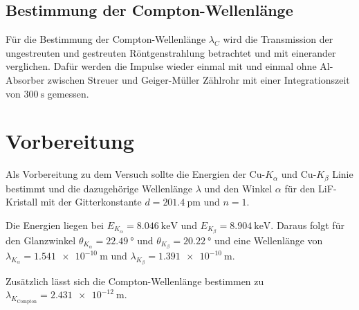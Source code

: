 \subsection{Bestimmung der Compton-Wellenlänge }
Für die Bestimmung der Compton-Wellenlänge $\lambda_C$ wird die Transmission der ungestreuten und gestreuten Röntgenstrahlung betrachtet und mit einerander verglichen. Dafür werden die Impulse 
wieder einmal mit und einmal ohne Al-Absorber zwischen Streuer und Geiger-Müller Zählrohr mit einer Integrationszeit von $\SI{300}{\second}$ gemessen.


\section{Vorbereitung}
\label{sub:emilit}
Als Vorbereitung zu dem Versuch sollte die Energien der Cu-$K_\alpha$ und Cu-$K_\beta$ Linie bestimmt und die dazugehörige Wellenlänge $\lambda$ und den Winkel $\alpha$ für den
LiF-Kristall mit der Gitterkonstante $d = \SI{201.4}{\pico\meter}$ und $n = 1$.

\noindent
Die Energien liegen bei $E_{K_\alpha} = \SI{8.046}{\kilo\eV}$ und $E_{K_\beta} = \SI{8.904}{\kilo\eV}$. Daraus folgt für den
Glanzwinkel  $\theta_{K_\alpha} = \SI{22.49}{\degree}$ und $\theta_{K_\beta} = \SI{20.22}{\degree}$ und eine Wellenlänge von $\lambda_{K_\alpha} = \SI{1,54 1e-10}{\meter}$
und $\lambda_{K_\beta} = \SI{1,39 1e-10}{\meter}$.

\noindent
Zusätzlich lässt sich die Compton-Wellenlänge bestimmen zu $\lambda_{K_\text{Compton}} = \SI{2,43 1e-12}{\meter}$.





